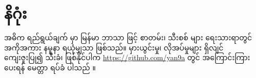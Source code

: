 \chapter{နိဂုံး}
\label{ch:Conclusion}

အဓိက ရည်ရွယ်ချက် မှာ မြန်မာ ဘာသာ ဖြင့် စာတမ်း၊ သီးစစ် များ ရေးသားရာတွင် အကိုအကား နမူနာ ရယုံမျှသာ ဖြစ်သည်။ မှားယွင်းမှု၊ လိုအပ်မှုများ ရှိလျင် ကျေးဇူးပြု၍ သီးခံ၊ ဖြစ်နိုင်ပါက \href{https://github.com/yan9a}{https://github.com/yan9a} တွင် အကြောင်းကြား ပေးရန် မေတ္တာ ရပ်ခံ ပါသည် \cite{Aye201702}။

